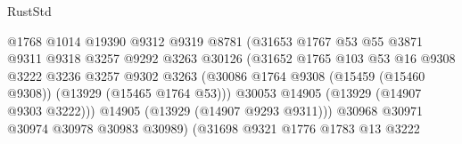 \begin{lexlean}{RustStd}
\begin{coremodule}
                                          @1768
                                          @1014
                                          @19390
                                          @9312
                                          @9319
                                          @8781
                                          (@31653
                                            @1767
                                            @53
                                            @55
                                            @3871
                                            @9311
                                            @9318
                                            @3257
                                            @9292
                                            @3263
                                            @30126
                                            (@31652
                                              @1765
                                              @103
                                              @53
                                              @16
                                              @9308
                                              @3222
                                              @3236
                                              @3257
                                              @9302
                                              @3263
                                              (@30086
                                                @1764
                                                @9308
                                                (@15459 (@15460 @9308))
                                                (@13929 (@15465 @1764 @53)))
                                              @30053
                                              @14905
                                              (@13929 (@14907 @9303 @3222)))
                                            @14905
                                            (@13929 (@14907 @9293 @9311)))
                                          @30968
                                          @30971
                                          @30974
                                          @30978
                                          @30983
                                          @30989)
                                        (@31698
                                          @9321
                                          @1776
                                          @1783
                                          @13
                                          @3222

\end{coremodule}
\end{lexlean}
